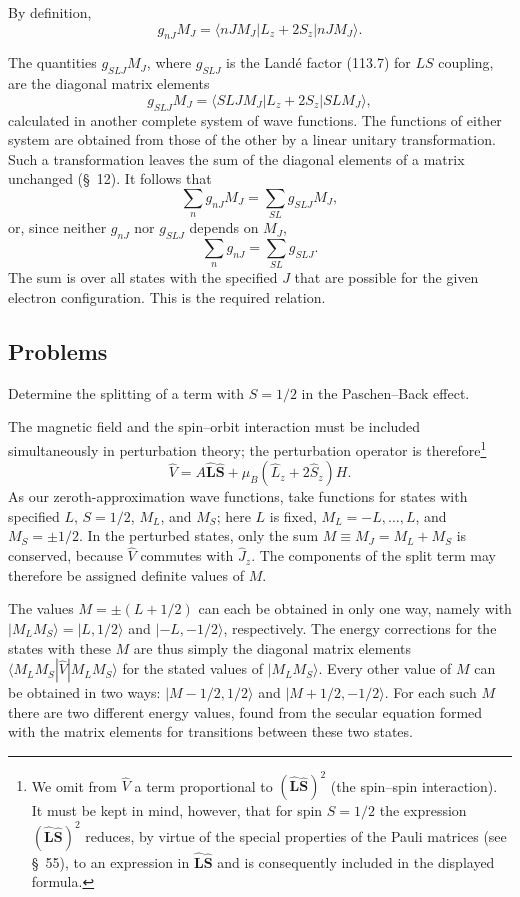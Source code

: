 By definition,
\[
 g_{nJ}M_J=\langle nJM_J|L_z+2S_z|nJM_J\rangle.
\]

The quantities $g_{SLJ}M_J$, where $g_{SLJ}$ is the Landé factor (113.7) for $LS$ coupling, are the diagonal matrix elements
\[
 g_{SLJ}M_J=\langle SLJM_J|L_z+2S_z|SLM_J\rangle,
\]
calculated in another complete system of wave functions. The functions of either system are obtained from those of the other by a linear unitary transformation. Such a transformation leaves the sum of the diagonal elements of a matrix unchanged (§~12). It follows that
\[
 \sum_n g_{nJ}M_J=\sum_{SL}g_{SLJ}M_J,
\]
or, since neither $g_{nJ}$ nor $g_{SLJ}$ depends on $M_J$,
\begin{equation}
 \sum_n g_{nJ}=\sum_{SL}g_{SLJ}.
 \tag{113.16}
\end{equation}
The sum is over all states with the specified $J$ that are possible for the given electron configuration. This is the required relation.

\subsection*{Problems}

 Determine the splitting of a term with $S=1/2$ in the Paschen--Back effect.

\SolutionHeading The magnetic field and the spin--orbit interaction must be included simultaneously in perturbation theory; the perturbation operator is therefore\footnote{We omit from $\hat V$ a term proportional to $(\hat{\mathbf L}\hat{\mathbf S})^2$ (the spin--spin interaction). It must be kept in mind, however, that for spin $S=1/2$ the expression $(\hat{\mathbf L}\hat{\mathbf S})^2$ reduces, by virtue of the special properties of the Pauli matrices (see §~55), to an expression in $\hat{\mathbf L}\hat{\mathbf S}$ and is consequently included in the displayed formula.}
\[
 \hat V=A\hat{\mathbf L}\hat{\mathbf S}+\mu_B(\hat L_z+2\hat S_z)H.
\]
As our zeroth-approximation wave functions, take functions for states with specified $L$, $S=1/2$, $M_L$, and $M_S$; here $L$ is fixed, $M_L=-L,\ldots,L$, and $M_S=\pm1/2$. In the perturbed states, only the sum $M\equiv M_J=M_L+M_S$ is conserved, because $\hat V$ commutes with $\hat J_z$. The components of the split term may therefore be assigned definite values of $M$.

The values $M=\pm(L+1/2)$ can each be obtained in only one way, namely with $|M_LM_S\rangle=|L,1/2\rangle$ and $|-L,-1/2\rangle$, respectively. The energy corrections for the states with these $M$ are thus simply the diagonal matrix elements $\langle M_LM_S|\hat V|M_LM_S\rangle$ for the stated values of $|M_LM_S\rangle$. Every other value of $M$ can be obtained in two ways: $|M-1/2,1/2\rangle$ and $|M+1/2,-1/2\rangle$. For each such $M$ there are two different energy values, found from the secular equation formed with the matrix elements for transitions between these two states.

